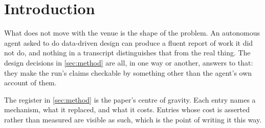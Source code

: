 \section{Introduction}
\label{sec:intro}


What does not move with the venue is the shape of the problem. An autonomous
agent asked to do data-driven design can produce a fluent report of work it did
not do, and nothing in a transcript distinguishes that from the real thing. The
design decisions in \cref{sec:method} are all, in one way or another, answers
to that: they make the run's claims checkable by something other than the
agent's own account of them.

The register in \cref{sec:method} is the paper's centre of gravity. Each entry
names a mechanism, what it replaced, and what it costs. Entries whose cost is
asserted rather than measured are visible as such, which is the point of
writing it this way.
